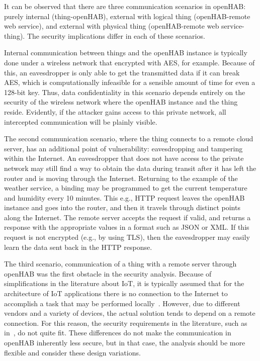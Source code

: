 \documentclass[12pt]{article}
\begin{document}
It can be observed that there are three communication scenarios in openHAB: purely internal (thing-openHAB), external with logical thing (openHAB-remote web service), and external with physical thing (openHAB-remote web service-thing). The security implications differ in each of these scenarios.

Internal communication between things and the openHAB instance is typically done under a wireless network that encrypted with AES, for example. Because of this, an eavesdropper is only able to get the transmitted data if it can break AES, which is computationally infeasible for a sensible amount of time for even a 128-bit key. Thus, data confidentiality in this scenario depends entirely on the security of the wireless network where the openHAB instance and the thing reside. Evidently, if the attacker gains access to this private network, all intercepted communication will be plainly visible.

The second communication scenario, where the thing connects to a remote cloud server, has an additional point of vulnerability: eavesdropping and tampering within the Internet. An eavesdropper that does not have access to the private network may still find a way to obtain the data during transit after it has left the router and is moving through the Internet. Returning to the example of the weather service, a binding may be programmed to get the current temperature and humidity every 10 minutes. This e.g., HTTP request leaves the openHAB instance and goes into the router, and then it travels through distinct points along the Internet. The remote server accepts the request if valid, and returns a response with the appropriate values in a format such as JSON or XML. If this request is not encrypted (e.g., by using TLS), then the eavesdropper may easily learn the data sent back in the HTTP response.

The third scenario, communication of a thing with a remote server through openHAB was the first obstacle in the security analysis. Because of simplifications in the literature about IoT, it is typically assumed that for the architecture of IoT applications there is no connection to the Internet to accomplish a task that may be performed locally~\cite{ALABA201710}. However, due to different vendors and a variety of devices, the actual solution tends to depend on a remote connection. For this reason, the security requirements in the literature, such as in~\cite{taekim}, do not quite fit. These differences do not make the communication in openHAB inherently less secure, but in that case, the analysis should be more flexible and consider these design variations. 
\end{document}
